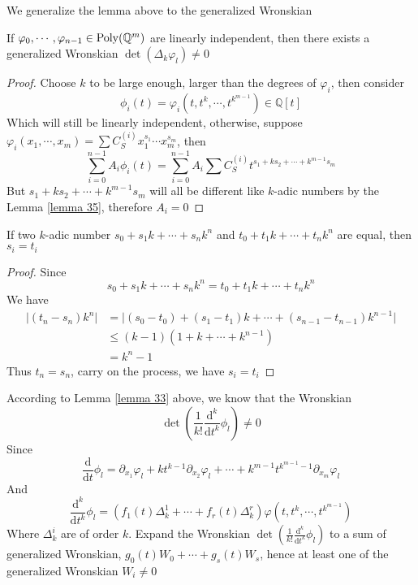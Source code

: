 We generalize the lemma above to the generalized Wronskian

\begin{lemma}\label{lemma 34}
If $ \varphi_{0}, \cdots, \varphi_{n-1} \in \operatorname{Poly}(\mathbb{Q}^{m}) $ are linearly independent, then there exists 
a generalized Wronskian $ \det(\Delta_{k}\varphi_{l}) \neq 0 $
\end{lemma}

\begin{proof}
Choose $ k $ to be large enough, larger than the degrees of $ \varphi_{i} $, then consider
$$ \phi_{i}(t) = \varphi_{i}\left(t,t^{k},\cdots,t^{k^{m-1}}\right) \in \mathbb{Q}[t] $$
Which will still be linearly independent, otherwise, suppose $ \varphi_{i}(x_{1},\cdots,x_{m}) = \sum C_{S}^{(i)}x_{1}^{s_{1}}\cdots x_{m}^{s_{m}} $, then
$$ \sum_{i=0}^{n-1}A_{i}\phi_{i}(t) = 
\sum_{i=0}^{n-1}A_{i}\sum C_{S}^{(i)}t^{s_{1}+ks_{2}+\cdots+k^{m-1}s_{m}} $$
But $ s_{1}+ks_{2}+\cdots+k^{m-1}s_{m} $ will all be different like $k$-adic numbers by the Lemma \ref{lemma 35}, therefore $ A_{i} = 0 $
\end{proof}

\begin{lemma}\label{lemma 35}
If two $k$-adic number $ s_{0}+s_{1}k+\cdots+s_{n}k^{n} $ and $ t_{0}+t_{1}k+\cdots+t_{n}k^{n} $ are equal, 
then $ s_{i} = t_{i} $
\end{lemma}

\begin{proof}
Since 
$$ s_{0}+s_{1}k+\cdots+s_{n}k^{n} = t_{0}+t_{1}k+\cdots+t_{n}k^{n} $$
We have
$$ 
\begin{aligned}
\Big| (t_{n}-s_{n})k^{n} \Big|
&= \Big| (s_{0}-t_{0})+(s_{1}-t_{1})k+\cdots+(s_{n-1}-t_{n-1})k^{n-1} \Big| \\
&\leq (k-1)(1+k+\cdots+k^{n-1}) \\
&= k^{n}-1 
\end{aligned}
$$
Thus $ t_{n} = s_{n} $, carry on the process, we have $ s_{i} = t_{i} $
\end{proof}

According to Lemma \ref{lemma 33} above, we know that the Wronskian 
$$ \det\left(\frac{1}{k!}\frac{\mathrm{d}^{k}}{\mathrm{d}t^{k}}\phi_{l}\right) \neq 0 $$
Since
$$ \frac{\mathrm{d}}{\mathrm{d}t}\phi_{l} = 
\partial_{x_{1}}\varphi_{l}+kt^{k-1}\partial_{x_{2}}\varphi_{l}+\cdots+k^{m-1}t^{k^{m-1}-1}\partial_{x_{m}}\varphi_{l} $$
And
$$ \frac{\mathrm{d}^{k}}{\mathrm{d}t^{k}}\phi_{l} = 
\left( f_{1}(t)\Delta_{k}^{1}+\cdots+f_{r}(t)\Delta_{k}^{r} \right) \varphi\left(t,t^{k},\cdots,t^{k^{m-1}}\right) $$
Where $ \Delta_{k}^{i} $ are of order $ k $. Expand the Wronskian $ \det\left(\frac{1}{k!}\frac{\mathrm{d}^{k}}{\mathrm{d}t^{k}}\phi_{l}\right) $ to a sum of generalized Wronskian, 
$ g_{0}(t)W_{0} + \cdots + g_{s}(t)W_{s} $, hence at least one of the generalized Wronskian $ W_{i} \neq 0 $ \par

